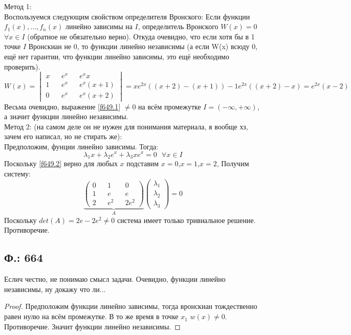\documentclass{article}
\begin{document}
Метод 1:\\ 
Воспользуемся следующим свойством определителя Вронского: Если функции $f_1(x),...,f_n(x)$ линейно зависимы на $I$, определитель Вронского $W(x)=0$ $\forall x \in I$ (обратное не обязательно верно). Откуда очевидно, что если хотя бы в 1 точке $I$ Вронскиан не 0, то функции линейно независимы (а если W(x) всюду 0, ещё нет гарантии, что функции линейно зависимы, это ещё необходимо проверить).\\
\begin{equation}\label{f649.1}
    W(x) = 
    \begin{vmatrix}
    x && e^x && e^x x \\
    1 && e^x && e^x(x+1)\\
    0 && e^x && e^x(x+2)
    \end{vmatrix}
    =x e^{2x} ((x+2)-(x+1))-1 e^{2x}((x+2)-x) = e^{2x}(x-2)
\end{equation}
Весьма очевидно, выражение \ref{f649.1} $\neq 0$ на всём промежутке $I=(-\infty,+\infty)$, а значит функции линейно независимы.\\

Метод 2: (на самом деле он не нужен для понимания материала, я вообще хз, зачем его написал, но не стирать же):\\
Предположим, фунции линейно зависимы. Тогда:
\begin{equation}\label{f649.2}
    \lambda_1 x + \lambda_2 e^x + \lambda_3 x e^x = 0 \text{ } \forall x \in I
\end{equation}
Поскольку \ref{f649.2} верно для любых $x$ подставим $x=0$,$x=1$,$x=2$, Получим систему:
\begin{equation}
    \underbrace{
    \begin{pmatrix}
    0 && 1 && 0\\
    1 && e && e\\
    2 && e^2 && 2e^2
    \end{pmatrix}}_{A}
    \begin{pmatrix}
    \lambda_1\\
    \lambda_2\\
    \lambda_3
    \end{pmatrix}
    =0
\end{equation}
 Поскольку $det(A)=2 e - 2 e^2 \neq 0$ система имеет только тривиальное решение. Противоречие. 
 \subsection{Ф.: 664}
 Еслич честно, не понимаю смысл задачи. Очевидно, функции линейно независимы, ну докажу что ли...
 \begin{proof}
Предположим функции линейно зависимы, тогда вронскиан тождественно равен нулю на всём промежутке. В то же время в точке $x_1$ $w(x) \neq 0$. Противоречие. Значит функции линейно независимы. 
 \end{proof}
\end{document}
